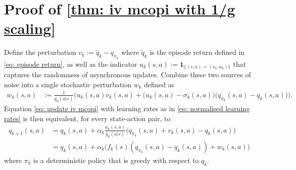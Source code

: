\section{Proof of \autoref{thm: iv mcopi with 1/g scaling}}
\label{app: proof of stochastic theorem}







Define the perturbation $v_k := \tilde q_k - q_{\pi_k}$ where $\tilde q_k$ is the episode return defined in \eqref{eq: episode return},
as well as the indicator $u_k(s, a) := \mathbf{1}_{\{(s,a)=(s_k,a_k)\}}$ that captures the randomness of asynchronous updates.
Combine these two sources of noise into a single stochastic perturbation $w_k$ defined as
\begin{align}
\label{eq: noise definition appendix}
w_k(s,a) 
&:=
\frac{1}{g_k(a | s)}
\Big( u_k(s,a) v_k(s,a)
+
\big( u_k(s,a) - \sigma_k(s,a) \big) \big( q_{\pi_k}(s,a) - q_k(s,a) \big) \Big) .
\end{align}
Equation \eqref{eq: update iv mcopi} with learning rates as in \eqref{eq: normalised learning rates} is then equivalent, for every state-action pair, to
\begin{align}
\nonumber
q_{k+1}(s,a)
&=
q_k(s,a) + \alpha_k \frac{u_k(s,a)}{g_k(a | s)} \big( q_{\pi_k}(s,a) + v_k(s,a) - q_k(s,a) \big)
\\
\label{eq: stochastic rep of normalised}
    &=
    q_k(s,a) + \alpha_k \big( f_k(s) ( q_{\pi_k}(s,a) - q_k(s,a) ) + w_k(s,a) \big) 
\end{align}
where $\pi_k$ is a deterministic policy that is greedy with respect to $q_k$.

